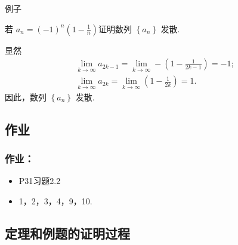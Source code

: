 \documentclass[mathserif]{beamer}
\begin{document}
\begin{frame}{例子}%
	\begin{ex}
		\suojin 若 $a_n=(-1)^n\left(1-\frac{1}{n}\right)$\jh 证明数列 $\left\{a_n\right\}$ 发散.
	\end{ex}
	\pause 
\begin{proofs}
\suojin 显然
	$$
	\begin{gathered}
			\lim _{k \rightarrow \infty} a_{2 k-1}=\lim _{k \rightarrow \infty}-\left(1-\frac{1}{2 k-1}\right)=-1 ; \\
			\lim _{k \rightarrow \infty} a_{2 k}=\lim _{k \rightarrow \infty}\left(1-\frac{1}{2 k}\right)=1 .
		\end{gathered}
	$$
	因此，数列 $\left\{a_n\right\}$ 发散.  
\end{proofs} 
\end{frame}



%




\subsection*{作业}

\begin{frame}
	\frametitle{作业：}
	\begin{itemize}
		\item P31\quad 习题2.2
		\item[]
		\begin{center}1，2，3，4，9，10.\end{center}
	\end{itemize}
\end{frame}






\subsection*{定理和例题的证明过程}
\end{document}
